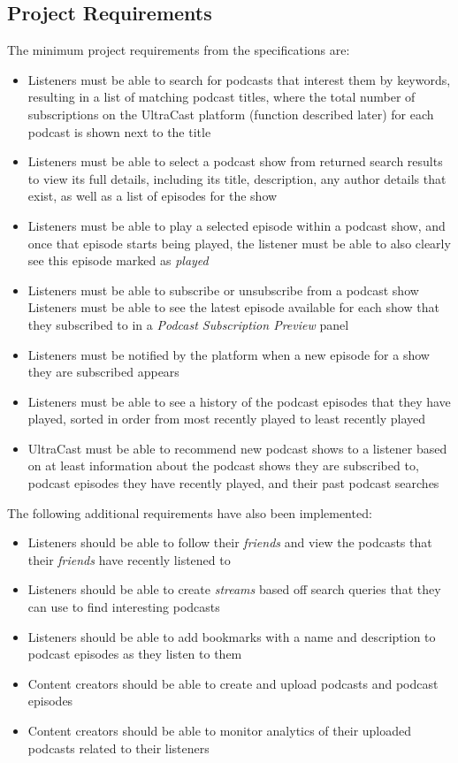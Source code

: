 \documentclass[../report.tex]{subfiles}
\begin{document}
\subsection{Project Requirements}
The minimum project requirements from the specifications are:
\begin{itemize}
    \item Listeners must be able to search for podcasts that interest them by keywords, resulting in a list of matching podcast titles, where the total number of subscriptions on the UltraCast platform (function described later) for each podcast is shown next to the title
    \item Listeners must be able to select a podcast show from returned search results to view its full details, including its title, description, any author details that exist, as well as a list of episodes for the show 
    \item Listeners must be able to play a selected episode within a podcast show, and once that episode starts being played, the listener must be able to also clearly see this episode marked as \textit{played}
    \item Listeners must be able to subscribe or unsubscribe from a podcast show         Listeners must be able to see the latest episode available for each show that they subscribed to in a \textit{Podcast Subscription Preview} panel
    \item Listeners must be notified by the platform when a new episode for a show  they are subscribed appears
    \item Listeners must be able to see a history of the podcast episodes that they have played, sorted in order from most recently played to least recently played
    \item UltraCast must be able to recommend new podcast shows to a listener based on at least information about the podcast shows they are subscribed to, podcast episodes they have recently played, and their past podcast searches
\end{itemize}
%
The following additional requirements have also been implemented:
\begin{itemize}
    \item Listeners should be able to follow their \textit{friends} and view the podcasts that their \textit{friends} have recently listened to
    \item Listeners should be able to create \textit{streams} based off search queries that they can use to find interesting podcasts
    \item Listeners should be able to add bookmarks with a name and description to podcast episodes as they listen to them
    \item Content creators should be able to create and upload podcasts and podcast episodes
    \item Content creators should be able to monitor analytics of their uploaded podcasts related to their listeners
\end{itemize}
\end{document}

